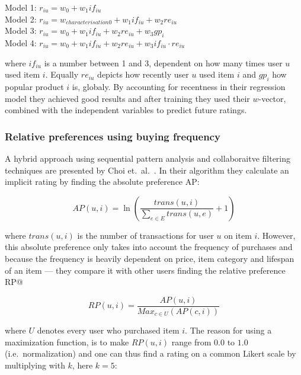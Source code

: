 \noindent
Model 1: $r_{iu} = w_0 + w_1 if_{iu}$ \\
Model 2: $r_{iu} = w_{characterisation0} + w_1 if_{iu} + w_2 re_{iu}$ \\
Model 3: $r_{iu} = w_0 + w_1 if_{iu} + w_2 re_{iu} + w_3 gp_{i}$ \\
Model 4: $r_{iu} = w_0 + w_1 if_{iu} + w_2 re_{iu} + w_3 if_{iu} \cdot re_{iu}$

where $if_{iu}$ is a number between 1 and 3, dependent on how many times user
$u$ used item $i$. Equally $re_{iu}$ depicts how recently user $u$ used item
$i$ and $gp_{i}$ how popular product $i$ is, globaly. By accounting for
recentness in their regression model they achieved good results  and after
training they used their $w$-vector, combined with the independent variables to
predict future ratings. 

\subsubsection{Relative preferences using buying frequency}

A hybrid approach using sequential pattern analysis and collaboraitve filtering
techniques are presented by Choi et.\ al.~\cite{choi2012hybrid}. In their
algorithm they calculate an implicit rating by finding the absolute preference
AP\@:

\begin{equation}
  AP(u,i) = \ln(\frac{trans(u,i)}{\sum_{e \in E}{trans(u, e)}} + 1)
\end{equation}


where $trans(u,i)$ is the number of transactions for user $u$ on item $i$.
However, this absolute preference only takes into account the frequency of
purchases and because the frequency is heavily dependent on price, item
category and lifespan of an item — they compare it with other users finding the
relative preference RP@\:

\begin{equation}
  RP(u,i) = \frac{AP(u,i)}{Max_{c \in U}(AP(c,i))}
\end{equation}

where $U$ denotes every user who purchased item $i$. The reason for using a
maximization function, is to make $RP(u,i)$ range from $0.0$ to $1.0$ (i.e.\
normalization) and one can thus find a rating on a common Likert scale by
multiplying with $k$, here $k=5$: \todo{Helge: Remove \", here k=5}

